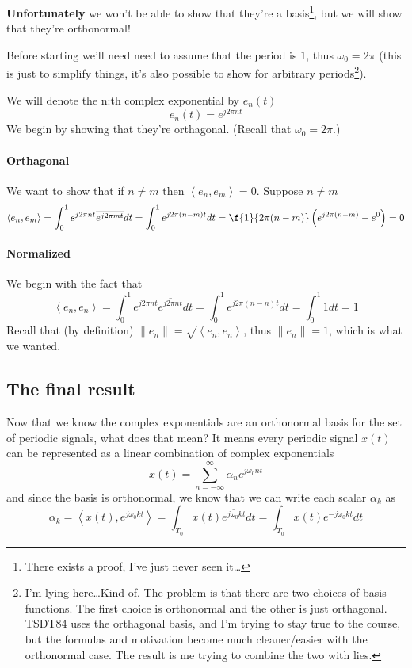 \documentclass{article}
\newcommand{\0}{{\mathbf{0}}}
\newcommand{\inner}[1]{\left\langle #1 \right\rangle}
\begin{document}
\textbf{Unfortunately} we won't be able to show that they're a basis\footnote{There exists a proof, I've just never seen it\dots},
but we will show that they're orthonormal!

Before starting we'll need need to assume that the period is $1$, thus $\omega_0 = 2\pi$ (this is just to simplify things, it's also possible
to show for arbitrary periods\footnote{I'm lying here\dots Kind of. The problem is that there are two choices of basis functions. The first choice is
  orthonormal and the other is just orthagonal. TSDT84 uses the orthagonal basis, and I'm trying to stay true to the course, but the formulas and motivation become much cleaner/easier
  with the orthonormal case. The result is me trying to combine the two with lies.}).

We will denote the n:th complex exponential by $e_n(t)$
$$ e_n(t) = e^{j 2\pi n t} $$
We begin by showing that they're orthagonal. (Recall that $\omega_0 = 2\pi$.)

\paragraph{Orthagonal} We want to show that if $n\neq m$ then $\inner{e_n, e_m} = 0$. Suppose $n\neq m$
$$\inner{e_n, e_m} = \int^{1}_{0} e^{j 2\pi n t}\overline{e^{j 2\pi m t}} dt = \int^{1}_{0} e^{j 2\pi (n-m) t} dt = \f{1}{2\pi(n-m)}\left( e^{j 2\pi (n-m)}- e^0 \right) = 0 $$

\paragraph{Normalized} We begin with the fact that
$$\inner{e_n, e_n} = \int^{1}_{0} e^{j 2\pi n t} \overline{e^{j 2\pi n t}} dt = \int^{1}_{0} e^{j 2\pi (n-n) t} dt = \int^{1}_0 1 dt = 1$$
Recall that (by definition) $\| e_n \| = \sqrt{ \inner{e_n, e_n} }$, thus $\| e_n \| = 1$, which is what we wanted.


\subsection{The final result}
Now that we know the complex exponentials are an orthonormal basis for the set of
periodic signals, what does that mean? It means every periodic signal $x(t)$
can be represented as a linear combination of complex exponentials
$$ x(t) = \sum^{\infty}_{n=-\infty} \alpha_{n} e^{j\omega_0 n t} $$
and since the basis is orthonormal, we know that we can write each scalar $\alpha_k$ as
$$ \alpha_k = \inner{x(t), e^{j\omega_0 k t}} = \int_{T_0} x(t)\overline{e^{j\omega_0 k t}} dt = \int_{T_0} x(t)e^{-j\omega_0 k t} dt $$
\end{document}
